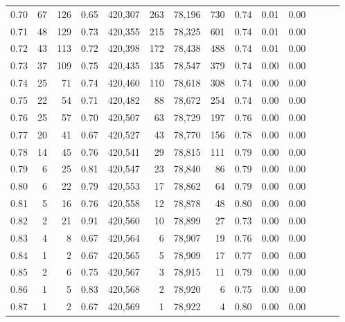 \begin{tabular}{rrrrrrrrrrrrrr}
0.70 &      67 &    126 &  0.65 &  420,307 &      263 &  78,196 &     730 &  0.74 &  0.01 &      0.00 \\
0.71 &      48 &    129 &  0.73 &  420,355 &      215 &  78,325 &     601 &  0.74 &  0.01 &      0.00 \\
0.72 &      43 &    113 &  0.72 &  420,398 &      172 &  78,438 &     488 &  0.74 &  0.01 &      0.00 \\
0.73 &      37 &    109 &  0.75 &  420,435 &      135 &  78,547 &     379 &  0.74 &  0.00 &      0.00 \\
0.74 &      25 &     71 &  0.74 &  420,460 &      110 &  78,618 &     308 &  0.74 &  0.00 &      0.00 \\
0.75 &      22 &     54 &  0.71 &  420,482 &       88 &  78,672 &     254 &  0.74 &  0.00 &      0.00 \\
0.76 &      25 &     57 &  0.70 &  420,507 &       63 &  78,729 &     197 &  0.76 &  0.00 &      0.00 \\
0.77 &      20 &     41 &  0.67 &  420,527 &       43 &  78,770 &     156 &  0.78 &  0.00 &      0.00 \\
0.78 &      14 &     45 &  0.76 &  420,541 &       29 &  78,815 &     111 &  0.79 &  0.00 &      0.00 \\
0.79 &       6 &     25 &  0.81 &  420,547 &       23 &  78,840 &      86 &  0.79 &  0.00 &      0.00 \\
0.80 &       6 &     22 &  0.79 &  420,553 &       17 &  78,862 &      64 &  0.79 &  0.00 &      0.00 \\
0.81 &       5 &     16 &  0.76 &  420,558 &       12 &  78,878 &      48 &  0.80 &  0.00 &      0.00 \\
0.82 &       2 &     21 &  0.91 &  420,560 &       10 &  78,899 &      27 &  0.73 &  0.00 &      0.00 \\
0.83 &       4 &      8 &  0.67 &  420,564 &        6 &  78,907 &      19 &  0.76 &  0.00 &      0.00 \\
0.84 &       1 &      2 &  0.67 &  420,565 &        5 &  78,909 &      17 &  0.77 &  0.00 &      0.00 \\
0.85 &       2 &      6 &  0.75 &  420,567 &        3 &  78,915 &      11 &  0.79 &  0.00 &      0.00 \\
0.86 &       1 &      5 &  0.83 &  420,568 &        2 &  78,920 &       6 &  0.75 &  0.00 &      0.00 \\
0.87 &       1 &      2 &  0.67 &  420,569 &        1 &  78,922 &       4 &  0.80 &  0.00 &      0.00 \\

\end{tabular}
